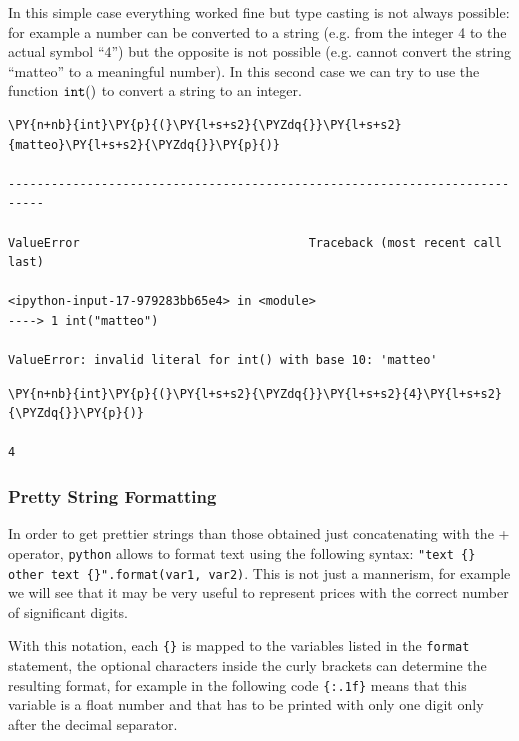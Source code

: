In this simple case everything worked fine but type casting is not always possible: for example a number can be converted to a string (e.g. from the integer 4 to the actual symbol ``4'') but the opposite is not possible (e.g. cannot convert the string ``matteo'' to a meaningful number). In this second case we can try to use the function \(\tt{int()}\) to convert a string to an integer.

\begin{codebox}            
\begin{Verbatim}[commandchars=\\\{\}]
\PY{n+nb}{int}\PY{p}{(}\PY{l+s+s2}{\PYZdq{}}\PY{l+s+s2}{matteo}\PY{l+s+s2}{\PYZdq{}}\PY{p}{)}

---------------------------------------------------------------------------

ValueError                                Traceback (most recent call last)

<ipython-input-17-979283bb65e4> in <module>
----> 1 int("matteo")  

ValueError: invalid literal for int() with base 10: 'matteo'
\end{Verbatim}
\end{codebox}

\begin{codebox}            
\begin{Verbatim}[commandchars=\\\{\}]
\PY{n+nb}{int}\PY{p}{(}\PY{l+s+s2}{\PYZdq{}}\PY{l+s+s2}{4}\PY{l+s+s2}{\PYZdq{}}\PY{p}{)}

4
\end{Verbatim}
\end{codebox}

\subsubsection{Pretty String Formatting}
In order to get prettier strings than those obtained just concatenating with the + operator, \texttt{python} allows to format text using the following syntax: \texttt{"text \{\} other text \{\}".format(var1, var2)}.
This is not just a mannerism, for example we will see that it may be very useful to represent prices with the correct 
number of significant digits.

With this notation, each \texttt{\{\}} is mapped to the variables listed in the \texttt{format} statement, the optional characters inside the curly brackets can determine the resulting format, for example in the following code \texttt{\{:.1f\}} means that this variable is a float number and that has to be printed with only one digit only after the decimal separator. 

